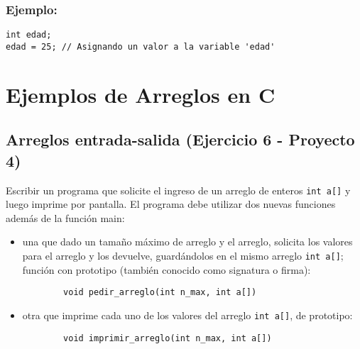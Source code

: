 \documentclass{article}
\begin{document}
\subsubsection*{Ejemplo:}

\begin{verbatim}
int edad;
edad = 25; // Asignando un valor a la variable 'edad'
\end{verbatim}


\newpage
\section{Ejemplos de Arreglos en C}

\subsection{Arreglos entrada-salida (Ejercicio 6 - Proyecto 4)}
Escribir un programa que solicite el ingreso de un arreglo de enteros \texttt{int a[]} y luego imprime por pantalla. El programa debe utilizar dos nuevas funciones además de la función main:
\begin{itemize}
    \item una que dado un tamaño máximo de arreglo y el arreglo, solicita los valores para el arreglo y los devuelve, guardándolos en el mismo arreglo \texttt{int a[]}; función con prototipo (también conocido como signatura o firma):
    \begin{verbatim}
        void pedir_arreglo(int n_max, int a[])
    \end{verbatim}
    \item otra que imprime cada uno de los valores del arreglo \texttt{int a[]}, de prototipo:
    \begin{verbatim}
        void imprimir_arreglo(int n_max, int a[])
    \end{verbatim}
\end{itemize}
\end{document}
